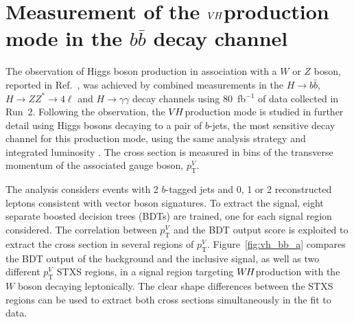 \documentclass{moriond}
\def\wh{\texorpdfstring{\ensuremath{W\kern -0.1em H}\xspace}{WH\xspace}}
\def\vh{\texorpdfstring{\ensuremath{V\kern -0.1em H}\xspace}{VH\xspace}}
\begin{document}
\section{Measurement of the \vh production mode in the $b\bar b$ decay channel}\label{sec:vh_bb}

The observation of Higgs boson production in association with a $W$ or $Z$ boson, reported in
Ref.~\cite{HIGG-2018-04}, was achieved by combined measurements in the $H{\rightarrow}b\bar b$,
$H{\rightarrow}ZZ^*{\rightarrow}4\ell$ and $H{\rightarrow}\gamma\gamma$ decay channels using
80~fb$^{-1}$ of data collected in Run~2.
Following the observation, the \vh production mode is studied in further detail using Higgs bosons
decaying to a pair of $b$-jets, the most sensitive decay channel for this production mode,
using the same analysis strategy and integrated luminosity \cite{Aaboud:2019nan}.
The cross section is measured in bins of the transverse momentum of the associated gauge boson,
$p^{V}_\mathrm{T}$.

The analysis considers events with 2 $b$-tagged jets and 0, 1 or 2 reconstructed leptons consistent
with vector boson signatures. To extract the signal, eight separate boosted decision trees (BDTs)
are trained, one for each signal region considered.
The correlation between $p^{V}_\mathrm{T}$ and the BDT output score is exploited
to extract the cross section in several regions of $p^{V}_\mathrm{T}$.
Figure~\ref{fig:vh_bb_a} compares the BDT output of the background and the inclusive signal,
as well as two different $p^{V}_\mathrm{T}$
STXS regions, in a signal region targeting \wh production with the $W$ boson decaying leptonically.
The clear shape differences between the STXS regions can be used to
extract both cross sections simultaneously in the fit to data.
\end{document}
